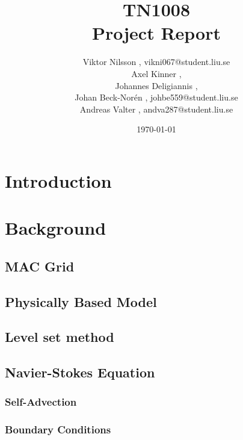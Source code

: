 \documentclass[]{report}   %
\begin{document}
\title{TN1008\\ Project Report}   %
\author{
  Viktor Nilsson , vikni067@student.liu.se 
  \\Axel Kinner ,
  \\Johannes Deligiannis ,
  \\Johan Beck-Norén , johbe559@student.liu.se
  \\Andreas Valter , andva287@student.liu.se
	}
        \date{\today}    %
        \maketitle
        
\setcounter{page}{2}



\begingroup
\let\clearpage\relax %
\chapter{Introduction}


\chapter{Background}
\section{MAC Grid}

\section{Physically Based Model}

\section{Level set method}

\section{Navier-Stokes Equation}

\subsection{Self-Advection}

\subsection{Boundary Conditions}

\end{document}
